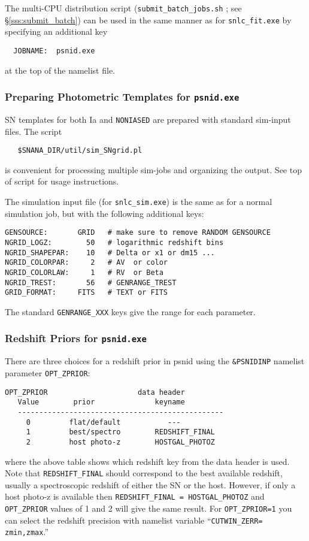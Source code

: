 \documentclass[12pt]{article}
\newcommand{\snfitter}{{\tt snlc\_fit.exe}}
\newcommand{\psnid}{{\tt psnid.exe}}
\newcommand{\NONIA}{{\tt NONIASED}}
\newcommand{\submit}{\tt submit\_batch\_jobs.sh}
\begin{document}
The multi-CPU distribution script ({\submit} ; see \S\ref{sss:submit_batch})
can be used in the same manner as for {\snfitter} by specifying an 
additional key
\begin{verbatim}
  JOBNAME:  psnid.exe
\end{verbatim}
at the top of the namelist file.


\clearpage
\subsubsection{Preparing Photometric Templates for {\psnid}}
\label{sss:sim_SNgrid}


SN templates for both Ia and {\NONIA} are prepared with
standard sim-input files. The script
\begin{verbatim}
   $SNANA_DIR/util/sim_SNgrid.pl
\end{verbatim}
is convenient for processing multiple sim-jobs
and organizing the output. 
See top of script for usage instructions.


The simulation input file (for {\tt snlc\_sim.exe}) 
is the same as for a normal simulation job,
but with the following additional keys:
%
\begin{Verbatim}[frame=single]
GENSOURCE:       GRID   # make sure to remove RANDOM GENSOURCE
NGRID_LOGZ:        50   # logarithmic redshift bins
NGRID_SHAPEPAR:    10   # Delta or x1 or dm15 ...
NGRID_COLORPAR:     2   # AV  or color
NGRID_COLORLAW:     1   # RV  or Beta
NGRID_TREST:       56   # GENRANGE_TREST
GRID_FORMAT:     FITS   # TEXT or FITS
\end{Verbatim}
%
The standard {\tt GENRANGE\_XXX} keys give the
range for each parameter.


\subsubsection{Redshift Priors for {\psnid}}
\label{sss:psnid_zprior}

There are three choices for a redshift prior in psnid
using the {\tt \&PSNIDINP} namelist parameter {\tt OPT\_ZPRIOR}:
%
\begin{Verbatim}[frame=single]
   OPT_ZPRIOR                     data header
   Value        prior              keyname
   ------------------------------------------------
     0         flat/default           ---
     1         best/spectro        REDSHIFT_FINAL
     2         host photo-z        HOSTGAL_PHOTOZ
\end{Verbatim}
%
where the above table shows which redshift key from the
data header is used. Note that {\tt REDSHIFT\_FINAL}
should correspond to the best available redshift,
usually a spectroscopic redshift of either the SN or the host.
However, if only a host photo-z is available then 
{\tt REDSHIFT\_FINAL = HOSTGAL\_PHOTOZ}
and {\tt OPT\_ZPRIOR} values of 1 and 2 will give the
same result.  For {\tt OPT\_ZPRIOR=1} you can 
select the redshift precision with namelist variable 
``{\tt CUTWIN\_ZERR= zmin,zmax}.''
\end{document}

